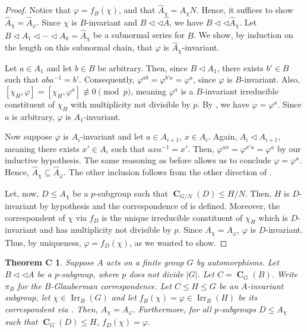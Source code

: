 \documentclass[12pt]{amsart}
\DeclareMathOperator{\CB}{\mathbf{C}}
\DeclareMathOperator{\Irr}{Irr}
\theoremstyle{remark}
\theoremstyle{definition}
\theoremstyle{plain}
\newtheorem*{thmC}{Theorem C}
\theoremstyle{definition}
\numberwithin{equation}{section}
\begin{document}
\begin{proof}
	Notice that $\varphi = f_B(\chi)$, and that $\hat{A}_\chi = A_\chi N$. Hence, it suffices to show $\hat{A}_\chi = \hat{A}_\varphi$. Since $\chi$ is $B$-invariant and $B{\triangleleft}{\triangleleft}\hat{A}$, we have $B{\triangleleft}{\triangleleft}\hat{A}_\chi$. Let $B \lhd A_1 \lhd \cdots \lhd A_k = \hat{A}_\chi$ be a subnormal series for $B$. We show, by induction on the length on this subnormal chain, that $\varphi$ is $\hat{A}_\chi$-invariant.
	
	Let $a \in A_1$ and let $b \in B$ be arbitrary. Then, since $B \lhd A_1$, there exists $b'\in B$ such that $aba^{-1} = b'$. Consequently, $\varphi^{ab} = \varphi^{b'a} = \varphi^a$, since $\varphi$ is $B$-invariant. Also, $[\chi_H, \varphi] = [\chi_H, \varphi^a] \not \equiv 0 \pmod{p}$, meaning $\varphi^a$ is a $B$-invariant irreducible constituent of $\chi_H$ with multiplicity not divisible by $p$. By , we have $\varphi = \varphi^a$. Since $a$ is arbitrary, $\varphi$ is $A_1$-invariant.
	
	Now suppose $\varphi$ is $A_i$-invariant and let $a \in A_{i + 1}$, $x \in A_i$. Again, $A_i \lhd A_{i+1}$, meaning there exists $x' \in A_i$ such that $axa^{-1} = x'$. Then, $\varphi^{ax} = \varphi^{x'a} = \varphi^a$ by our inductive hypothesis. The same reasoning as before allows us to conclude $\varphi = \varphi^a$. Hence, $\hat{A}_\chi \subseteq \hat{A}_\varphi$. The other inclusion follows from the other direction of .
	
	Let, now, $D \leq A_\chi$ be a $p$-subgroup such that $\CB_{G/N}(D) \leq H/N$. Then, $H$ is $D$-invariant by hypothesis and the correspondence of  is defined. Moreover, the correspondent of $\chi$ via $f_D$ is the unique irreducible constituent of $\chi_H$ which is $D$-invariant and has multiplicity not divisible by $p$. Since $A_\chi = A_\varphi$, $\varphi$ is $D$-invariant. Thus, by uniqueness, $\varphi = f_D(\chi)$, as we wanted to show.
\end{proof}

\begin{thmC}
	Suppose $A$ acts on a finite group $G$ by automorphisms. Let $B {\triangleleft}{\triangleleft} A$ be a $p$-subgroup, where $p$ does not divide $|G|$. Let $C = \CB_{G}(B)$. Write $\pi_B$ for the $B$-Glauberman correspondence. Let $C \leq H \leq G$ be an $A$-invariant subgroup, let $\chi \in \Irr_B(G)$ and let $f_B(\chi) = \varphi \in \Irr_B(H)$ be its correspondent via . Then, $A_\chi = A_\varphi$. Furthermore, for all $p$-subgroups $D \leq A_\chi$ such that $\CB_{G}(D) \leq H$, $f_D(\chi) = \varphi$.
\end{thmC}
\end{document}
